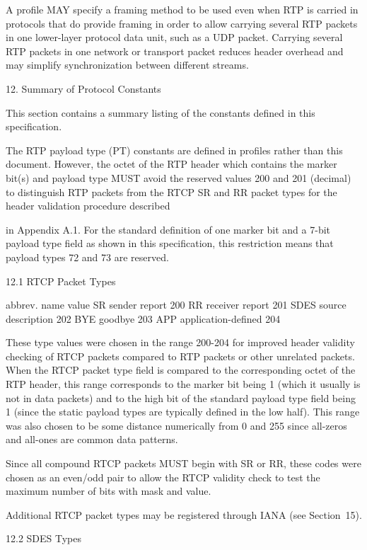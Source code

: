 \documentclass{article}
\begin{document}
A profile MAY specify a framing method to be used even when RTP is carried in protocols that do provide framing in order to allow carrying several RTP packets in one lower-layer protocol data unit, such as a UDP packet.  Carrying several RTP packets in one network or transport packet reduces header overhead and may simplify synchronization between different streams.

12. Summary of Protocol Constants

This section contains a summary listing of the constants defined in this specification.

The RTP payload type (PT) constants are defined in profiles rather than this document.  However, the octet of the RTP header which contains the marker bit(s) and payload type MUST avoid the reserved values 200 and 201 (decimal) to distinguish RTP packets from the RTCP SR and RR packet types for the header validation procedure described

in Appendix A.1.  For the standard definition of one marker bit and a 7-bit payload type field as shown in this specification, this restriction means that payload types 72 and 73 are reserved.

12.1 RTCP Packet Types

abbrev.  name                 value SR       sender report          200 RR       receiver report        201 SDES     source description     202 BYE      goodbye                203 APP      application-defined    204

These type values were chosen in the range 200-204 for improved header validity checking of RTCP packets compared to RTP packets or other unrelated packets.  When the RTCP packet type field is compared to the corresponding octet of the RTP header, this range corresponds to the marker bit being 1 (which it usually is not in data packets) and to the high bit of the standard payload type field being 1 (since the static payload types are typically defined in the low half). This range was also chosen to be some distance numerically from 0 and 255 since all-zeros and all-ones are common data patterns.

Since all compound RTCP packets MUST begin with SR or RR, these codes were chosen as an even/odd pair to allow the RTCP validity check to test the maximum number of bits with mask and value.

Additional RTCP packet types may be registered through IANA (see Section~15).

12.2 SDES Types
\end{document}
